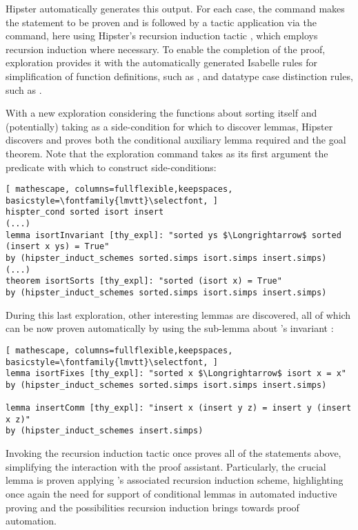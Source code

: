 \noindent Hipster automatically generates this output.
%
For each case, the  command makes the statement to be proven and is followed by a tactic application via the  command, here using Hipster's recursion induction tactic , which employs recursion induction where necessary.
%
To enable the completion of the proof, exploration provides it with the automatically generated Isabelle rules for simplification of function definitions, such as , and datatype case distinction rules, such as .

With a new exploration considering the functions about sorting itself and (potentially) taking  as a side-condition for which to discover lemmas, Hipster discovers and proves both the conditional auxiliary lemma required and the goal theorem.
%
Note that the exploration command takes as its first argument the predicate with which to construct side-conditions:

\begin{lstlisting}[ mathescape, columns=fullflexible,keepspaces, basicstyle=\fontfamily{lmvtt}\selectfont, ]
hispter_cond sorted isort insert
(...)
lemma isortInvariant [thy_expl]: "sorted ys $\Longrightarrow$ sorted (insert x ys) = True"
by (hipster_induct_schemes sorted.simps isort.simps insert.simps)
(...)
theorem isortSorts [thy_expl]: "sorted (isort x) = True"
by (hipster_induct_schemes sorted.simps isort.simps insert.simps)
\end{lstlisting}

During this last exploration, other interesting lemmas are discovered, all of which can be now proven automatically by using the sub-lemma about 's invariant :

\begin{lstlisting}[ mathescape, columns=fullflexible,keepspaces, basicstyle=\fontfamily{lmvtt}\selectfont, ]
lemma isortFixes [thy_expl]: "sorted x $\Longrightarrow$ isort x = x"
by (hipster_induct_schemes sorted.simps isort.simps insert.simps)

lemma insertComm [thy_expl]: "insert x (insert y z) = insert y (insert x z)"
by (hipster_induct_schemes insert.simps)
\end{lstlisting}

Invoking the recursion induction tactic  once proves all of the statements above, simplifying the interaction with the proof assistant.
%
Particularly, the crucial lemma  is proven applying 's associated recursion induction scheme, highlighting once again the need for support of conditional lemmas in automated inductive proving and the possibilities recursion induction brings towards proof automation.


